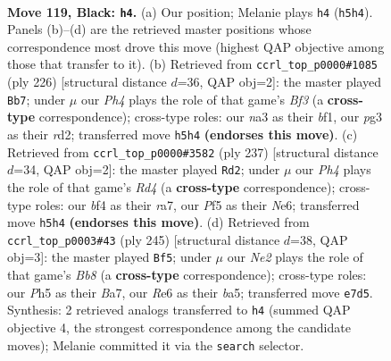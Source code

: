 \documentclass[11pt]{article}
\begin{document}
\clearpage

\begin{figure}[p]\centering
\begin{subfigure}{0.46\textwidth}\centering
\resizebox{\linewidth}{!}{%
\newchessgame
\chessboard[
  setfen={k6K/4n3/p3r3/P4p1p/5B2/N5Pb/8/R7 b - - 49 119},
  showmover=false,
  pgfstyle=straightmove, color=movearrow, markmove={h5-h4}
]}
\caption{}
\end{subfigure}\hfill
\begin{subfigure}{0.46\textwidth}\centering
\resizebox{\linewidth}{!}{%
\newchessgame
\chessboard[
  setfen={8/K5k1/p5p1/P3R1P1/8/5B2/3r4/5b2 w - - 82 114},
  showmover=false,
  pgfstyle=straightmove, color=movearrow, markmove={f3-b7}
]}
\caption{}
\end{subfigure}
\\[4pt]
\begin{subfigure}{0.46\textwidth}\centering
\resizebox{\linewidth}{!}{%
\newchessgame
\chessboard[
  setfen={4k3/R7/4n1p1/3r1p2/7P/5PP1/8/B4K2 b - - 24 119},
  showmover=false,
  pgfstyle=straightmove, color=movearrow, markmove={d5-d2}
]}
\caption{}
\end{subfigure}\hfill
\begin{subfigure}{0.46\textwidth}\centering
\resizebox{\linewidth}{!}{%
\newchessgame
\chessboard[
  setfen={8/bB6/P2k2p1/B1p4p/7P/4K1P1/8/1b6 b - - 36 123},
  showmover=false,
  pgfstyle=straightmove, color=movearrow, markmove={b1-f5}
]}
\caption{}
\end{subfigure}
\caption{\textbf{Move 119, Black: \texttt{h4}.} (a) Our position; Melanie plays \texttt{h4} (\texttt{h5h4}). Panels (b)--(d) are the retrieved master positions whose correspondence most drove this move (highest QAP objective among those that transfer to it). (b) Retrieved from \texttt{ccrl\_top\_p0000\#1085} (ply 226) [structural distance $d$=36, QAP obj=2]: the master played \texttt{Bb7}; under $\mu$ our \emph{Ph4} plays the role of that game's \emph{Bf3} (a \textbf{cross-type} correspondence); cross-type roles: our \emph{n}a3 as their \emph{b}f1, our \emph{p}g3 as their \emph{r}d2; transferred move \texttt{h5h4} \textbf{(endorses this move)}. (c) Retrieved from \texttt{ccrl\_top\_p0000\#3582} (ply 237) [structural distance $d$=34, QAP obj=2]: the master played \texttt{Rd2}; under $\mu$ our \emph{Ph4} plays the role of that game's \emph{Rd4} (a \textbf{cross-type} correspondence); cross-type roles: our \emph{b}f4 as their \emph{r}a7, our \emph{P}f5 as their \emph{N}e6; transferred move \texttt{h5h4} \textbf{(endorses this move)}. (d) Retrieved from \texttt{ccrl\_top\_p0003\#43} (ply 245) [structural distance $d$=38, QAP obj=3]: the master played \texttt{Bf5}; under $\mu$ our \emph{Ne2} plays the role of that game's \emph{Bb8} (a \textbf{cross-type} correspondence); cross-type roles: our \emph{P}h5 as their \emph{B}a7, our \emph{R}e6 as their \emph{b}a5; transferred move \texttt{e7d5}. Synthesis: 2 retrieved analogs transferred to \texttt{h4} (summed QAP objective 4, the strongest correspondence among the candidate moves); Melanie committed it via the \texttt{search} selector.}
\label{fig:thought-m237}
\end{figure}
\end{document}
